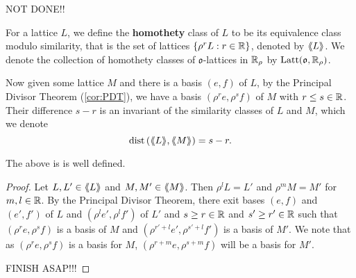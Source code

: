 \documentclass[draft]{amsart}
\DeclareMathOperator{\dist}{dist}
\DeclareMathOperator{\lat}{Latt}
\newcommand{\llangle}{\langle \hspace{-.25em}\langle}
\newcommand{\rrangle}{\rangle \hspace{-.25em}\rangle}
\begin{document}
    
NOT DONE!!


\begin{defn}\label{def:homothety}
    For a lattice \(L\), we define the \textbf{homothety} class of \(L\) to be its equivalence class modulo similarity, that is the set of lattices \(\left\{ \rho^r L : r\in \mathbb{R} \right\}\), denoted by \(\llangle L \rrangle\). We denote the collection of homothety classes of \(\mathfrak o\)-lattices in \(\mathbb{R}_\rho\) by \(\lat(\mathfrak o,\R_\rho)\).
\end{defn}

Now given some lattice \(M\) and there is a basis \((e,f)\) of \(L\), by the Principal Divisor Theorem (\ref{cor:PDT}), we have a basis \((\rho^r e,\rho^s f)\) of \(M\) with \(r\le s \in \mathbb{R}\). Their difference \(s-r\) is an invariant of the similarity classes of \(L\) and \(M\), which we denote
\[ \dist \p{\llangle L \rrangle, \llangle M \rrangle}=s-r.\]
\begin{lemma}\label{lemma:wellDefinedDist}
    The above is is well defined. 
\end{lemma} 
\begin{proof}
    Let \(L,L'\in \llangle L \rrangle \) and \(M,M'\in \llangle M \rrangle\). Then \(\rho^l L=L'\) and \(\rho^m M= M'\) for \(m,l\in \mathbb{R}\). By the Principal Divisor Theorem, there exit bases \((e,f)\) and \((e',f')\) of \(L\) and \((\rho^l e',\rho^l f')\) of \(L'\) and \(s\ge r\in \mathbb{R}\) and \(s'\ge r'\in \mathbb{R}\) such that \((\rho^r e,\rho^s f)\) is a basis of \(M\) and \((\rho^{r'+l} e',\rho^{s'+l} f')\) is a basis of \(M'\). We note that as \((\rho^r e, \rho^s f)\) is a basis for \(M\), \((\rho^{r+m} e, \rho^{s+m} f)\) will be a basis for \(M'\).

    FINISH ASAP!!!
\end{proof}
    
\end{document}
